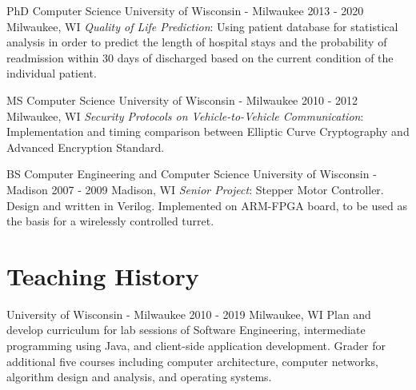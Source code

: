 \documentclass[]{clean-resume}
\begin{document}
\entry
	{PhD Computer Science}
	{University of Wisconsin - Milwaukee}
	{2013 - 2020}
	{Milwaukee, WI}
	{
		\emph{Quality of Life Prediction}: Using patient database for statistical analysis in order to predict the length of hospital stays and the probability of readmission within 30 days of discharged based on the current condition of the individual patient.
	}

\entry
	{MS Computer Science}
	{University of Wisconsin - Milwaukee}
	{2010 - 2012}
	{Milwaukee, WI}
	{
		\emph{Security Protocols on Vehicle-to-Vehicle Communication}: Implementation and timing comparison between Elliptic Curve Cryptography and Advanced Encryption Standard.
	}

\entry
	{BS Computer Engineering and Computer Science}
	{University of Wisconsin - Madison}
	{2007 - 2009}
	{Madison, WI}
	{
		\emph{Senior Project}: Stepper Motor Controller. Design and written in Verilog. Implemented on 
		ARM-FPGA board, to be used as the basis for a wirelessly controlled turret.
	}

\section{Teaching History}

\entry
	{University of Wisconsin - Milwaukee}
	{}
	{2010 - 2019}
	{Milwaukee, WI}
	{
		Plan and develop curriculum for lab sessions of Software Engineering, intermediate programming using Java, and client-side application development. Grader for additional five courses including computer architecture, computer networks, algorithm design and analysis, and operating systems.
	}
\end{document}
